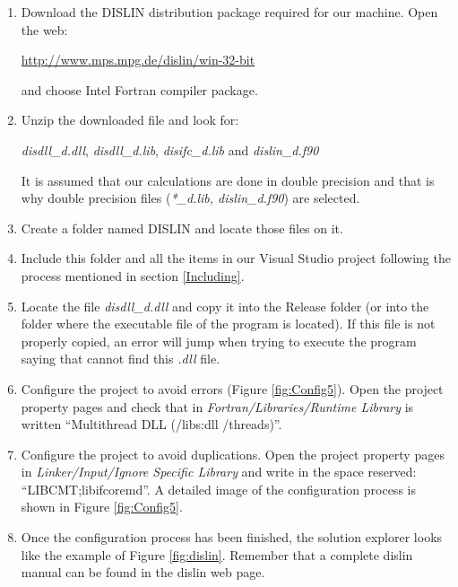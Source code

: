 \begin{enumerate}[nosep]
    
    \item Download the DISLIN distribution package required for our machine. Open the web:
    
    \url{http://www.mps.mpg.de/dislin/win-32-bit} 
    
    and choose Intel Fortran compiler package. 
    
    \item  Unzip the downloaded file and look for: 
    
    \textit{disdll\_d.dll}, \textit{disdll\_d.lib}, \textit{disifc\_d.lib} and \textit{dislin\_d.f90}
     
    It is assumed that our calculations are done in double precision and that is why double precision files (\textit{*\_d.lib, dislin\_d.f90}) are selected. 
     
    \item Create a folder named DISLIN and locate those files on it. 
    
    \item Include this folder and all the items in our Visual Studio project following the process mentioned in section \ref{Including}.
    
    \item Locate the file \textit{disdll\_d.dll} and copy it into the Release folder (or into the folder where the executable file of the program is located). If this file is not properly copied, an error will jump when trying to execute the program saying that cannot find this \textit{.dll} file. 
    
    \item Configure the project to avoid errors (Figure \ref{fig:Config5}). Open the project property pages and check that in \textit{Fortran/Libraries/Runtime Library} is written ``Multithread DLL (/libs:dll /threads)''.
    
    \item Configure the project to avoid duplications. Open the project property pages in \textit{Linker/Input/Ignore Specific Library} and write in the space reserved: ``LIBCMT;libifcoremd''. A detailed image of the configuration process is shown in Figure \ref{fig:Config5}.
    
    \item Once the configuration process has been finished, the solution explorer looks like the example of Figure \ref{fig:dislin}. Remember that a complete dislin manual can be found in the dislin web page.  
 
\end{enumerate} 


